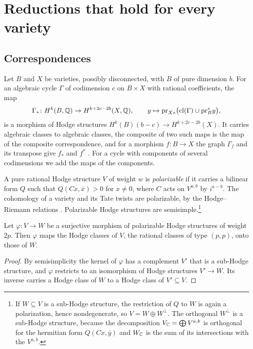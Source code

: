 \section{Reductions that hold for every variety}\label{sec:reductions}

\subsection{Correspondences}
Let $B$ and $X$ be varieties, possibly disconnected, with $B$ of pure
dimension $b$. For an algebraic cycle $\Gamma$ of codimension $c$ on
$B\times X$ with rational coefficients, the map
\[
  \Gamma_{*}\colon H^{k}(B,\mathbb{Q})\to H^{k+2c-2b}(X,\mathbb{Q}),\qquad
  y\mapsto\mathrm{pr}_{X*}\bigl(\operatorname{cl}(\Gamma)\cup\mathrm{pr}_{B}^{*}y\bigr),
\]
is a morphism of Hodge structures $H^{k}(B)(b-c)\to H^{k+2c-2b}(X)$. It
carries algebraic classes to algebraic classes, the composite of two such
maps is the map of the composite correspondence, and for a morphism
$f\colon B\to X$ the graph $\Gamma_{f}$ and its transpose give $f_{*}$ and
$f^{*}$ \cite[Chapter~16]{Ful98}. For a cycle with components of several
codimensions we add the maps of the components.

A pure rational Hodge structure $V$ of weight $w$ is \emph{polarizable} if
it carries a bilinear form $Q$ such that $Q(Cx,\bar x)>0$ for $x\ne0$, where
$C$ acts on $V^{a,b}$ by $i^{a-b}$. The cohomology of a variety and its Tate
twists are polarizable, by the Hodge--Riemann relations
\cite[Chapter~6]{Voi02b}. Polarizable Hodge structures are
semisimple.\footnote{If $W\subseteq V$ is a sub-Hodge structure, the
restriction of $Q$ to $W$ is again a polarization, hence nondegenerate, so
$V=W\oplus W^{\perp}$. The orthogonal $W^{\perp}$ is a sub-Hodge structure,
because the decomposition $V_{\mathbb{C}}=\bigoplus V^{a,b}$ is orthogonal for the
hermitian form $Q(Cx,\bar y)$ and $W_{\mathbb{C}}$ is the sum of its intersections
with the $V^{a,b}$.}

\begin{lemma}\label{lem:lift}
Let $\varphi\colon V\to W$ be a surjective morphism of polarizable Hodge
structures of weight $2p$. Then $\varphi$ maps the Hodge classes of $V$, the
rational classes of type $(p,p)$, onto those of $W$.
\end{lemma}

\begin{proof}
By semisimplicity the kernel of $\varphi$ has a complement $V'$ that is a
sub-Hodge structure, and $\varphi$ restricts to an isomorphism of Hodge
structures $V'\to W$. Its inverse carries a Hodge class of $W$ to a Hodge
class of $V'\subseteq V$.
\end{proof}


